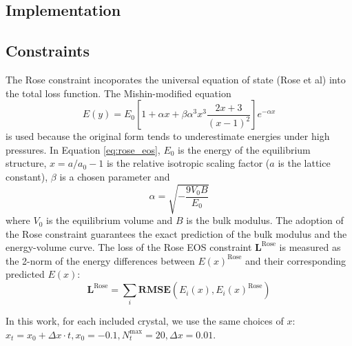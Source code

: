\documentclass[prb,reprint]{revtex4-2}
\begin{document}
\subsection{Implementation}
\label{sec:implementation}

\subsection{Constraints}
\label{sec:constraints}

The Rose constraint incoporates the universal equation of state (Rose et al) 
into the total loss function. The Mishin-modified equation 
\begin{equation}
\label{eq:rose_eos}
E(y) = E_{0}\left[
    1 + \alpha x + \beta \alpha^3 x^3 \frac{2x + 3}{(x - 1)^2} \right]
    e^{-\alpha x}
\end{equation}
is used because the original form tends to underestimate energies under high 
pressures. In Equation \ref{eq:rose_eos}, $E_{0}$ is the energy of the 
equilibrium structure, $x = a / a_{0} - 1$ is the relative isotropic scaling 
factor ($a$ is the lattice constant), $\beta$ is a chosen parameter and 
\begin{equation}
\label{eq:rose_alpha}
\alpha = \sqrt{-\frac{9 V_{0} B }{E_{0}}}
\end{equation}
where $V_0$ is the equilibrium volume and $B$ is the bulk modulus. The adoption
of the Rose constraint guarantees the exact prediction of the bulk modulus and 
the energy-volume curve. The loss of the Rose EOS constraint 
$\mathbf{L}^{\mathrm{Rose}}$  is measured as the 2-norm of the energy 
differences between $E(x)^{\mathrm{Rose}}$ and their corresponding predicted 
$E(x)$: 
\begin{equation}
\label{eq:rose_loss}
\mathbf{L}^{\mathrm{Rose}} =
\sum_{i}{\mathbf{RMSE}(E_{i}(x), E_{i}(x)^{\mathrm{Rose}})}
\end{equation}

In this work, for each included crystal, we use the same choices of $x$: 
$x_{t} = x_{0} + \Delta x \cdot t, x_{0} = -0.1, N_{t}^{\mathrm{max}} = 20, 
\Delta x=0.01$.
\end{document}
